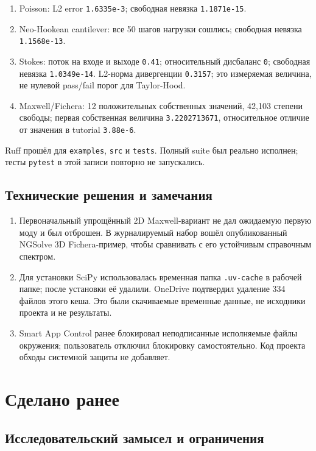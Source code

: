 \documentclass[11pt,a4paper]{article}
\begin{document}
\begin{enumerate}
    \item Poisson: L2 error \texttt{1.6335e-3}; свободная невязка \texttt{1.1871e-15}.
    \item Neo-Hookean cantilever: все 50 шагов нагрузки сошлись; свободная невязка \texttt{1.1568e-13}.
    \item Stokes: поток на входе и выходе \texttt{0.41}; относительный дисбаланс \texttt{0}; свободная невязка \texttt{1.0349e-14}. L2-норма дивергенции \texttt{0.3157}; это измеряемая величина, не нулевой pass/fail порог для Taylor-Hood.
    \item Maxwell/Fichera: 12 положительных собственных значений, 42,103 степени свободы; первая собственная величина \texttt{3.2202713671}, относительное отличие от значения в tutorial \texttt{3.88e-6}.
\end{enumerate}

Ruff прошёл для \texttt{examples}, \texttt{src} и \texttt{tests}. Полный suite был реально исполнен; тесты \texttt{pytest} в этой записи повторно не запускались.

\subsection{Технические решения и замечания}

\begin{enumerate}
    \item Первоначальный упрощённый 2D Maxwell-вариант не дал ожидаемую первую моду и был отброшен. В журналируемый набор вошёл опубликованный NGSolve 3D Fichera-пример, чтобы сравнивать с его устойчивым справочным спектром.
    \item Для установки SciPy использовалась временная папка \texttt{.uv-cache} в рабочей папке; после установки её удалили. OneDrive подтвердил удаление 334 файлов этого кеша. Это были скачиваемые временные данные, не исходники проекта и не результаты.
    \item Smart App Control ранее блокировал неподписанные исполняемые файлы окружения; пользователь отключил блокировку самостоятельно. Код проекта обходы системной защиты не добавляет.
\end{enumerate}

\section{Сделано ранее}

\subsection{Исследовательский замысел и ограничения}
\end{document}
